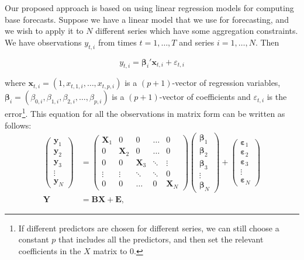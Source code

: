 \documentclass[11pt,a4paper,]{article}
\begin{document}
Our proposed approach is based on using linear regression models for computing base forecasts. Suppose we have a linear model that we use for forecasting, and we wish to apply it to \(N\) different series which have some aggregation constraints. We have observations \(y_{t,i}\) from times \(t=1,\dots,T\) and series \(i=1,\dots,N\). Then

\begin{equation}
\label{eq:basicequation}
  y_{t,i} = \bm{\beta}_{i}' \bm{x}_{t,i} + \varepsilon_{t,i} 
\end{equation}

where \(\bm{x}_{t,i}= (1, x_{t,1,i},\dots,x_{t,p,i})\) is a \((p+1)\)-vector of regression variables, \({\bm{\beta}}_i = (\beta_{0,i}, \beta_{1,i}, \beta_{2,i}, \dots, \beta_{p,i})\) is a \((p+1)\)-vector of coefficients and \({\varepsilon}_{t,i}\) is the error\footnote{If different predictors are chosen for different series, we can still choose a constant \(p\) that includes all the predictors, and then set the relevant coefficients in the \(X\) matrix to \(0\).}. This equation for all the observations in matrix form can be written as follows:
\begin{align}\label{eq:linearmodel}
  \begin{pmatrix}
  \bm{y}_1\\
  \bm{y}_2\\
  \bm{y}_3 \\
  \vdots\\
  \bm{y}_N
  \end{pmatrix}&=
  \begin{pmatrix}
  \bm{X}_1 & 0        & 0        & \dots  & 0\\
  0        & \bm{X}_2 & 0        & \dots  & 0\\
  0        & 0        & \bm{X}_3 & \ddots & \vdots \\
  \vdots   & \vdots   & \ddots   & \ddots & 0\\
  0        & 0        & \dots    & 0      & \bm{X}_N
  \end{pmatrix}
  \begin{pmatrix}
  \bm{\beta}_1\\
  \bm{\beta}_2\\
  \bm{\beta}_3\\
  \vdots\\
  \bm{\beta}_N
  \end{pmatrix}+
  \begin{pmatrix}
  \bm{\varepsilon}_1\\
  \bm{\varepsilon}_2\\
  \bm{\varepsilon}_3\\
  \vdots \\
  \bm{\varepsilon}_N
  \end{pmatrix}
  \\[2ex]
  \bm{Y} &= \bm{BX} + \bm{E},
\end{align}
\end{document}
